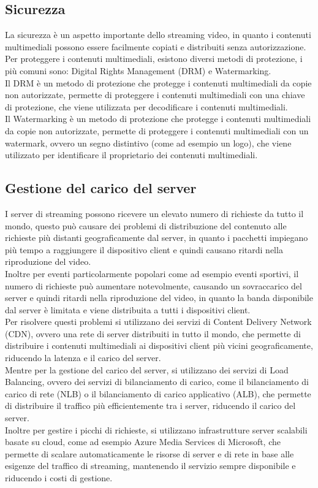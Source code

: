 \subsection{Sicurezza}
La sicurezza è un aspetto importante dello streaming video, in quanto i contenuti multimediali possono essere facilmente copiati e distribuiti senza autorizzazione.
Per proteggere i contenuti multimediali, esistono diversi metodi di protezione, i più comuni sono: Digital Rights Management (DRM) e Watermarking.\\
Il DRM è un metodo di protezione che protegge i contenuti multimediali da copie non autorizzate, permette di proteggere i contenuti multimediali con una chiave di protezione,
che viene utilizzata per decodificare i contenuti multimediali.\\
Il Watermarking è un metodo di protezione che protegge i contenuti multimediali da copie non autorizzate, permette di proteggere i contenuti multimediali con un watermark, ovvero un segno distintivo (come ad esempio un logo), 
che viene utilizzato per identificare il proprietario dei contenuti multimediali.\\

\subsection{Gestione del carico del server}
I server di streaming possono ricevere un elevato numero di richieste da tutto il mondo, questo può causare dei problemi di distribuzione del contenuto 
alle richieste più distanti geograficamente dal server, in quanto i pacchetti impiegano più tempo a raggiungere il dispositivo client e quindi causano ritardi nella riproduzione del video.\\
Inoltre per eventi particolarmente popolari come ad esempio eventi sportivi, il numero di richieste può aumentare notevolmente, causando un sovraccarico del server e quindi ritardi nella riproduzione
del video, in quanto la banda disponibile dal server è limitata e viene distribuita a tutti i dispositivi client.\\
Per risolvere questi problemi si utilizzano dei servizi di Content Delivery Network (CDN), ovvero una rete di server distribuiti in tutto il mondo, che permette di distribuire i contenuti multimediali
ai dispositivi client più vicini geograficamente, riducendo la latenza e il carico del server.\\
Mentre per la gestione del carico del server, si utilizzano dei servizi di Load Balancing, ovvero dei servizi di bilanciamento di carico, come il bilanciamento di carico di rete (NLB) o il 
bilanciamento di carico applicativo (ALB), che permette di distribuire il traffico più efficientemente tra i server, riducendo il carico del server.\\
Inoltre per gestire i picchi di richieste, si utilizzano infrastrutture server scalabili basate su cloud, come ad esempio Azure Media Services di Microsoft, che permette di scalare automaticamente le risorse di
server e di rete in base alle esigenze del traffico di streaming, mantenendo il servizio sempre disponibile e riducendo i costi di gestione.\\

